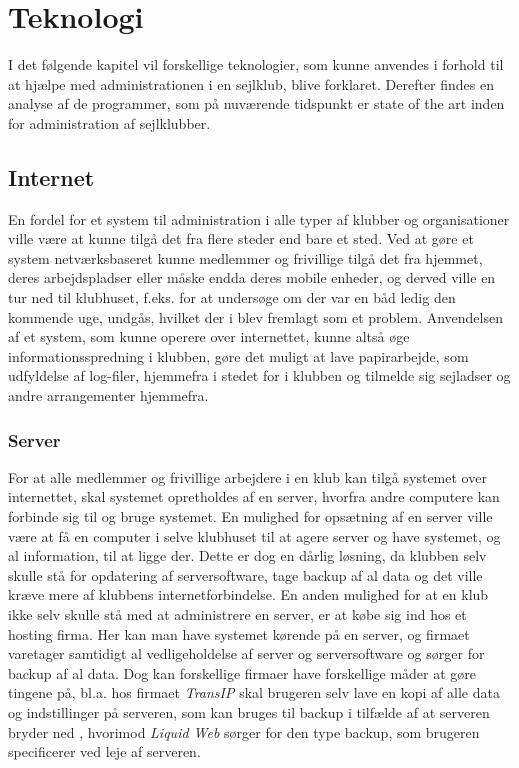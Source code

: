 \chapter{Teknologi}\label{chap:teknologi-analyse}

I det følgende kapitel vil forskellige teknologier, som kunne anvendes i forhold til at hjælpe med
administrationen i en sejlklub, blive forklaret. Derefter findes en analyse af de programmer, som på nuværende
tidspunkt er state of the art inden for administration af sejlklubber.


\section{Internet}

En fordel for et system til administration i alle typer af klubber og organisationer ville være at kunne tilgå
det fra flere steder end bare et sted. Ved at gøre et system netværksbaseret kunne medlemmer og frivillige
tilgå det fra hjemmet, deres arbejdspladser eller måske endda deres mobile enheder, og derved ville en tur ned
til klubhuset, f.eks. for at undersøge om der var en båd ledig den kommende uge, undgås, hvilket der i
 blev fremlagt som et problem. Anvendelsen af et system, som kunne operere
over internettet, kunne altså øge informationsspredning i klubben, gøre det muligt at lave papirarbejde, som
udfyldelse af log-filer, hjemmefra i stedet for i klubben og tilmelde sig sejladser og andre arrangementer
hjemmefra. 


\subsection*{Server}

For at alle medlemmer og frivillige arbejdere i en klub kan tilgå systemet over internettet, skal systemet
opretholdes af en server, hvorfra andre computere kan forbinde sig til og bruge systemet. En mulighed for
opsætning af en server ville være at få en computer i selve klubhuset til at agere server og have systemet, og
al information, til at ligge der. Dette er dog en dårlig løsning, da klubben selv skulle stå for opdatering af
serversoftware, tage backup af al data og det ville kræve mere af klubbens internetforbindelse. En anden
mulighed for at en klub ikke selv skulle stå med at administrere en server, er at købe sig ind hos et hosting
firma. Her kan man have systemet kørende på en server, og firmaet varetager samtidigt al vedligeholdelse af
server og serversoftware og sørger for backup af al data. Dog kan forskellige firmaer have forskellige måder
at gøre tingene på, bl.a. hos firmaet \textit{TransIP}  skal brugeren selv
lave en kopi af alle data og indstillinger på serveren, som kan bruges til backup i tilfælde af at serveren
bryder ned \citep{Virtuelserver}, hvorimod \textit{Liquid Web} \citep{liquid} sørger for den type backup, som
brugeren specificerer ved leje af serveren.

